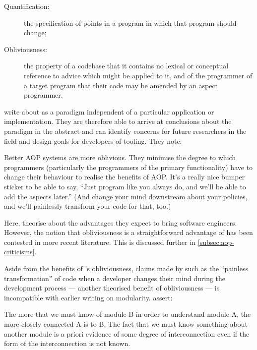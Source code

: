 \begin{description}
  \item[Quantification:] the specification of points in a program in
  which that program should change;
  \item[Obliviousness:] the property of a codebase that it contains no lexical
  or conceptual reference to advice which might be applied to it, and of the
  programmer of a target program that their code may be amended by an aspect
  programmer.
\end{description}

\citeauthor{filman2000aspect} write about \aspectorientation{} as a paradigm
independent of a particular application or implementation. They are therefore
able to arrive at conclusions about the paradigm in the abstract and can
identify concerns for future researchers in the field and design goals for
developers of \aspectoriented{} tooling. They note:

\begin{displayquote}
  Better AOP systems are more oblivious. They minimise the degree to which
  programmers (particularly the programmers of the primary functionality) have
  to change their behaviour to realise the benefits of AOP. It's a really nice
  bumper sticker to be able to say, ``Just program like you always do, and we'll
  be able to add the aspects later.'' (And change your mind downstream about
  your policies, and we'll painlessly transform your code for that,
  too.)~\cite{filman2000aspect}
\end{displayquote}

Here, \citeauthor{filman2000aspect} theorise about the advantages they expect
\aspectorientation{} to bring software engineers. However, the notion that
obliviousness is a straightforward advantage of \aop{} has been contested in
more recent literature. This is discussed further in
\cref{subsec:aop-criticisms}.

Aside from the benefits of \aop{}'s obliviousness, claims made by
\citeauthor{filman2000aspect} such as the ``painless transformation'' of code
when a developer changes their mind during the development process --- another
theorised benefit of obliviousness --- is incompatible with earlier writing on
modularity. \citet{yourdon1979structured} assert:

\begin{displayquote}
  The more that we must know of module B in order to understand module A, the
  more closely connected A is to B. The fact that we must know something about
  another module is a priori evidence of some degree of interconnection even if
  the form of the interconnection is not known.
\end{displayquote}

